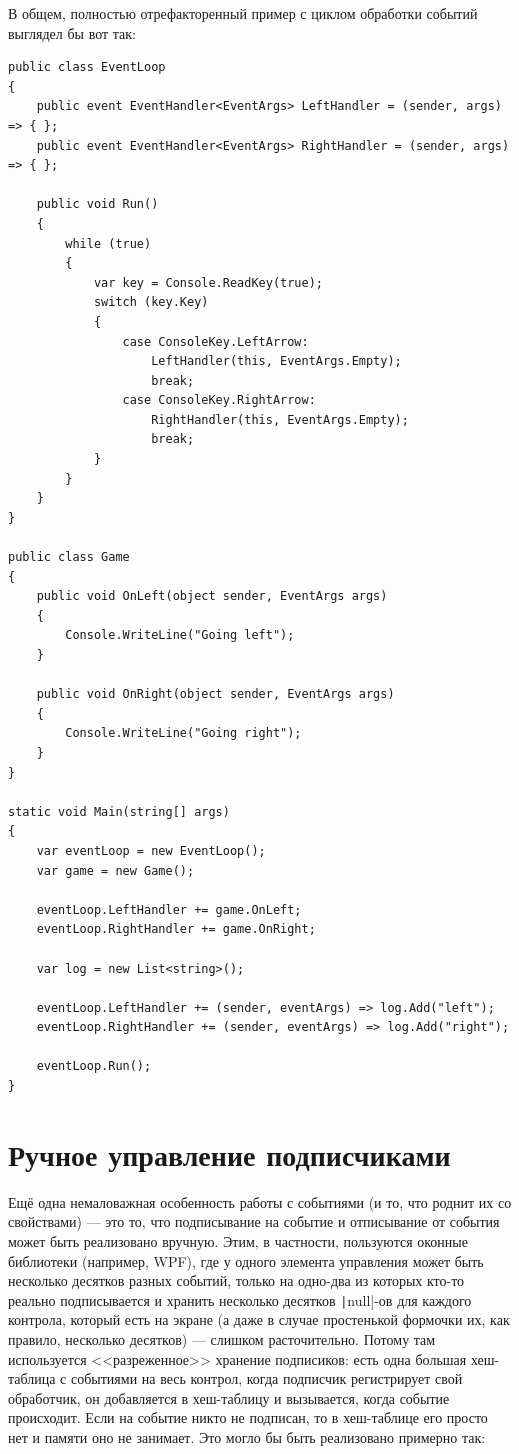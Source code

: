 \documentclass[a5paper]{article}
\begin{document}
В общем, полностью отрефакторенный пример с циклом обработки событий выглядел бы вот так:

\begin{verbatim}
public class EventLoop
{
    public event EventHandler<EventArgs> LeftHandler = (sender, args) => { };
    public event EventHandler<EventArgs> RightHandler = (sender, args) => { };

    public void Run()
    {
        while (true)
        {
            var key = Console.ReadKey(true);
            switch (key.Key)
            {
                case ConsoleKey.LeftArrow:
                    LeftHandler(this, EventArgs.Empty);
                    break;
                case ConsoleKey.RightArrow:
                    RightHandler(this, EventArgs.Empty);
                    break;
            }
        }
    }
}

public class Game
{
    public void OnLeft(object sender, EventArgs args)
    {
        Console.WriteLine("Going left");
    }

    public void OnRight(object sender, EventArgs args)
    {
        Console.WriteLine("Going right");
    }
}

static void Main(string[] args)
{
    var eventLoop = new EventLoop();
    var game = new Game();

    eventLoop.LeftHandler += game.OnLeft;
    eventLoop.RightHandler += game.OnRight;

    var log = new List<string>();

    eventLoop.LeftHandler += (sender, eventArgs) => log.Add("left");
    eventLoop.RightHandler += (sender, eventArgs) => log.Add("right");

    eventLoop.Run();
}
\end{verbatim}

\section{Ручное управление подписчиками}

Ещё одна немаловажная особенность работы с событиями (и то, что роднит их со свойствами) --- это то, что подписывание на событие и отписывание от события может быть реализовано вручную. Этим, в частности, пользуются оконные библиотеки (например, WPF), где у одного элемента управления может быть несколько десятков разных событий, только на одно-два из которых кто-то реально подписывается и хранить несколько десятков \texttt|null|-ов для каждого контрола, который есть на экране (а даже в случае простенькой формочки их, как правило, несколько десятков) --- слишком расточительно. Потому там используется <<разреженное>> хранение подписиков: есть одна большая хеш-таблица с событиями на весь контрол, когда подписчик регистрирует свой обработчик, он добавляется в хеш-таблицу и вызывается, когда событие происходит. Если на событие никто не подписан, то в хеш-таблице его просто нет и памяти оно не занимает. Это могло бы быть реализовано примерно так:
\end{document}
